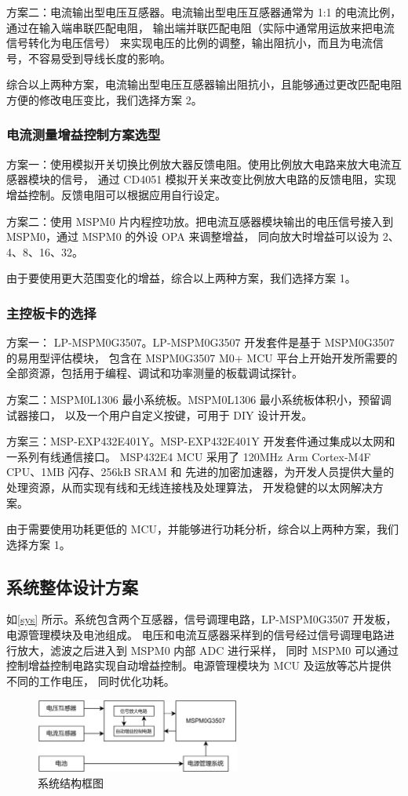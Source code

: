 \documentclass[a4paper,12pt,UTF8]{article}
\begin{document}
方案二：电流输出型电压互感器。电流输出型电压互感器通常为 1:1 的电流比例，通过在输入端串联匹配电阻，
输出端并联匹配电阻（实际中通常用运放来把电流信号转化为电压信号）
来实现电压的比例的调整，输出阻抗小，而且为电流信号，不容易受到导线长度的影响。

综合以上两种方案，电流输出型电压互感器输出阻抗小，且能够通过更改匹配电阻方便的修改电压变比，我们选择方案 2。

\subsubsection{电流测量增益控制方案选型}
方案一：使用模拟开关切换比例放大器反馈电阻。使用比例放大电路来放大电流互感器模块的信号，
通过 CD4051 模拟开关来改变比例放大电路的反馈电阻，实现增益控制。反馈电阻可以根据应用自行设定。

方案二：使用 MSPM0 片内程控功放。把电流互感器模块输出的电压信号接入到 MSPM0，通过 MSPM0 的外设 OPA 来调整增益，
同向放大时增益可以设为 2、4、8、16、32。   

由于要使用更大范围变化的增益，综合以上两种方案，我们选择方案 1。


\subsubsection{主控板卡的选择}
方案一： LP-MSPM0G3507。LP-MSPM0G3507 开发套件是基于 MSPM0G3507 的易用型评估模块，
包含在 MSPM0G3507 M0+ MCU 平台上开始开发所需要的全部资源，包括用于编程、调试和功率测量的板载调试探针。

方案二：MSPM0L1306 最小系统板。MSPM0L1306 最小系统板体积小，预留调试器接口，
以及一个用户自定义按键，可用于 DIY 设计开发。

方案三：MSP-EXP432E401Y。MSP-EXP432E401Y 开发套件通过集成以太网和一系列有线通信接口。
MSP432E4 MCU 采用了 120MHz Arm Cortex-M4F CPU、1MB 闪存、256kB SRAM 和
先进的加密加速器，为开发人员提供大量的处理资源，从而实现有线和无线连接栈及处理算法，
开发稳健的以太网解决方案。

由于需要使用功耗更低的 MCU，并能够进行功耗分析，综合以上两种方案，我们选择方案 1。

\subsection{系统整体设计方案}
如\autoref{sys} 所示。系统包含两个互感器，信号调理电路，LP-MSPM0G3507 开发板，电源管理模块及电池组成。
电压和电流互感器采样到的信号经过信号调理电路进行放大，滤波之后进入到 MSPM0 内部 ADC 进行采样，
同时 MSPM0 可以通过控制增益控制电路实现自动增益控制。电源管理模块为 MCU 及运放等芯片提供不同的工作电压，
同时优化功耗。
\begin{figure}[htbp]
    \centering
    \includegraphics[width=0.6\textwidth]{figures/sys_flowchart.png}
    \caption{系统结构框图}
    \label{sys}
\end{figure}
\end{document}
